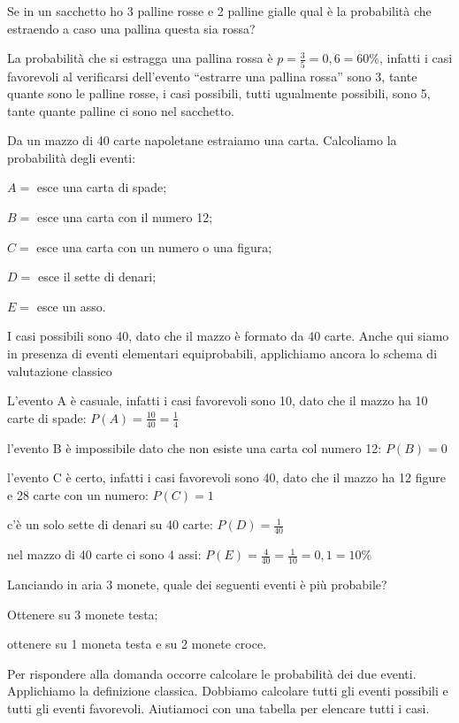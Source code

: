 \begin{exrig}
\begin{esempio}
Se in un sacchetto ho 3 palline rosse e 2 palline gialle qual è la probabilità 
che estraendo a caso una pallina questa sia rossa?

La probabilità che si estragga una pallina rossa è $p=\frac 3 
5=0,6=60\text{\%}$, infatti i casi favorevoli al verificarsi dell'evento 
``estrarre una pallina rossa'' sono 3, tante quante sono le palline rosse, i 
casi possibili, tutti ugualmente possibili, sono 5, tante quante palline ci sono 
nel sacchetto.
\end{esempio}

\begin{esempio}
Da un mazzo di 40 carte napoletane estraiamo una carta. Calcoliamo la 
probabilità degli eventi:
\begin{itemize*}
\item $A=$ esce una carta di spade;
\item $B=$ esce una carta con il numero 12;
\item $C=$ esce una carta con un numero o una figura;
\item $D=$ esce il sette di denari;
\item $E=$ esce un asso.
\end{itemize*}
I casi possibili sono 40, dato che il mazzo è formato da 40 carte. Anche qui 
siamo in presenza di eventi elementari equiprobabili, applichiamo ancora lo 
schema di valutazione classico
\begin{itemize*}
\item L'evento A è casuale, infatti i casi favorevoli sono 10, dato che il mazzo 
ha 10 carte di spade: $P(A)=\frac{10}{40}=\frac 1 4$
\item l'evento B è impossibile dato che non esiste una carta col numero 12: $ 
P(B)=0 $
\item l'evento C è certo, infatti i casi favorevoli sono 40, dato che il mazzo 
ha 12 figure e 28 carte con un numero: $P(C)=1$
\item c'è un solo sette di denari su 40 carte: $P(D)=\frac 1{40}$
\item nel mazzo di 40 carte ci sono 4 assi: $P(E)=\frac 4{40}=\frac 
1{10}=0,1=10\%$
\end{itemize*}
\end{esempio}

\begin{esempio}
Lanciando in aria 3 monete, quale dei seguenti eventi è più probabile?
\begin{itemize*}
\item Ottenere su 3 monete testa;
\item ottenere su 1 moneta testa e su 2 monete croce.
\end{itemize*}
Per rispondere alla domanda occorre calcolare le probabilità dei due eventi. 
Applichiamo la definizione classica. Dobbiamo calcolare tutti gli eventi 
possibili e tutti gli eventi favorevoli.
Aiutiamoci con una tabella per elencare tutti i casi.


\end{esempio}
\end{exrig}

